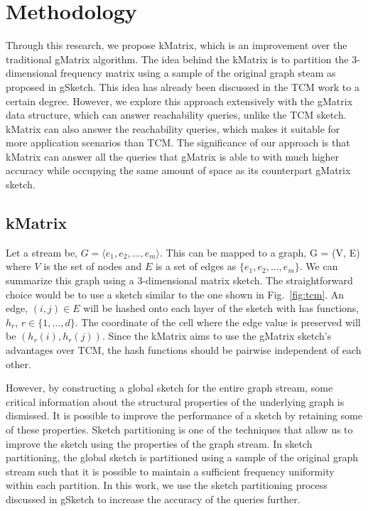 \section{Methodology}
\label{sec:methodology}

Through this research, we propose kMatrix, which is an improvement over the traditional gMatrix algorithm. The idea behind the kMatrix is to partition the 3-dimensional frequency matrix using a sample of the original graph steam as proposed in gSketch\cite{zhao_gsketch:_2011}. This idea has already been discussed in the TCM\cite{tang_graph_2016} work to a certain degree. However, we explore this approach extensively with the gMatrix data structure, which can answer reachability queries, unlike the TCM sketch. kMatrix can also answer the reachability queries, which makes it suitable for more application scenarios than TCM. The significance of our approach is that kMatrix can answer all the queries that gMatrix is able to with much higher accuracy while occupying the same amount of space as its counterpart gMatrix sketch. 

\subsection{kMatrix}

Let a stream be, \(G = \langle e_{1}, e_{2}, \ldots, e_{m} \rangle\). This can be mapped to a graph, G = (V, E) where \(V\) is the set of nodes and \(E\) is a set of edges as \(\{e_{1}, e_{2}, \ldots, e_{m}\}\). We can summarize this graph using a 3-dimensional matrix sketch\cite{khan_query-friendly_2016}. The straightforward choice would be to use a sketch similar to the one shown in Fig.~\ref{fig:tcm}. An edge, \((i, j) \in E\) will be hashed onto each layer of the sketch with has functions, \(h_{r}\), \(r \in \{1, \ldots, d\}\). The coordinate of the cell where the edge value is preserved will be \((h_{r}(i), h_{r}(j))\). Since the kMatrix aims to use the gMatrix sketch’s advantages over TCM, the hash functions should be pairwise independent of each other. 

However, by constructing a global sketch for the entire graph stream, some critical information about the structural properties of the underlying graph is dismissed. It is possible to improve the performance of a sketch by retaining some of these properties. Sketch partitioning\cite{zhao_gsketch:_2011} is one of the techniques that allow us to improve the sketch using the properties of the graph stream. In sketch partitioning, the global sketch is partitioned using a sample of the original graph stream such that it is possible to maintain a sufficient frequency uniformity within each partition. In this work, we use the sketch partitioning process discussed in gSketch to increase the accuracy of the queries further.

